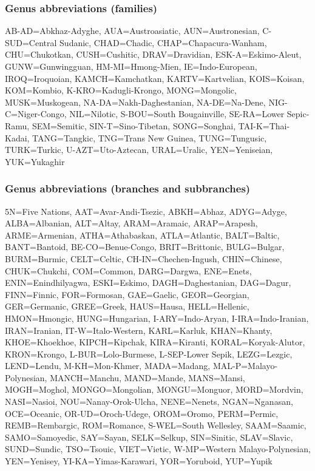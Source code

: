 
\subsubsection{Genus abbreviations (families)}
\begin{flushleft}
AB-AD=Abkhaz-Adyghe, AUA=Austroasiatic, AUN=Austronesian, C-SUD=Central Sudanic, CHAD=Chadic, CHAP=Chapacura-Wanham, CHU=Chukotkan, CUSH=Cushitic, DRAV=Dravidian, ESK-A=Eskimo-Aleut, GUNW=Gunwingguan, HM-MI=Hmong-Mien, IE=Indo-European, IROQ=Iroquoian, KAMCH=Kamchatkan, KARTV=Kartvelian, KOIS=Koisan, KOM=Kombio, K-KRO=Kadugli-Krongo, MONG=Mongolic, MUSK=Muskogean, NA-DA=Nakh-Daghestanian, NA-DE=Na-Dene, NIG-C=Niger-Congo, NIL=Nilotic, S-BOU=South Bougainville, SE-RA=Lower Sepic-Ramu, SEM=Semitic, SIN-T=Sino-Tibetan, SONG=Songhai, TAI-K=Thai-Kadai, TANG=Tangkic, TNG=Trans New Guinea, TUNG=Tungusic, TURK=Turkic, U-AZT=Uto-Aztecan, URAL=Uralic, YEN=Yeniseian, YUK=Yukaghir
\end{flushleft}

\subsubsection{Genus abbreviations (branches and subbranches)}
\begin{flushleft}
5N=Five Nations, AAT=Avar-Andi-Tsezic, ABKH=Abhaz, ADYG=Adyge, ALBA=Albanian, ALT=Altay, ARAM=Aramaic, ARAP=Arapesh, ARME=Armenian, ATHA=Athabaskan, ATLA=Atlantic, BALT=Baltic, BANT=Bantoid, BE-CO=Benue-Congo, BRIT=Brittonic, BULG=Bulgar, BURM=Burmic, CELT=Celtic, CH-IN=Chechen-Ingush, CHIN=Chinese, CHUK=Chukchi, COM=Common, DARG=Dargwa, ENE=Enets, ENIN=Enindhilyagwa, ESKI=Eskimo, DAGH=Daghestanian, DAG=Dagur, FINN=Finnic, FOR=Formosan, GAE=Gaelic, GEOR=Georgian, GER=Germanic, GREE=Greek, HAUS=Hausa, HELL=Hellenic, HMON=Hmongic, HUNG=Hungarian, I-ARY=Indo-Aryan, I-IRA=Indo-Iranian, IRAN=Iranian, IT-W=Italo-Western, KARL=Karluk, KHAN=Khanty, KHOE=Khoekhoe, KIPCH=Kipchak, KIRA=Kiranti, KORAL=Koryak-Alutor, KRON=Krongo, L-BUR=Lolo-Burmese, L-SEP-Lower Sepik, LEZG=Lezgic, LEND=Lendu, M-KH=Mon-Khmer, MADA=Madang, MAL-P=Malayo-Polynesian, MANCH=Manchu, MAND=Mande, MANS=Mansi, MOGH=Moghol, MONGO=Mongolian, MONGU=Monguor, MORD=Mordvin, NASI=Nasioi, NOU=Nanay-Orok-Ulcha, NENE=Nenets, NGAN=Nganasan, OCE=Oceanic, OR-UD=Oroch-Udege, OROM=Oromo, PERM=Permic,  REMB=Rembargic, ROM=Romance, S-WEL=South Wellesley, SAAM=Saamic, SAMO=Samoyedic, SAY=Sayan, SELK=Selkup, SIN=Sinitic, SLAV=Slavic, SUND=Sundic, TSO=Tsouic, VIET=Vietic, W-MP=Western Malayo-Polynesian, YEN=Yenisey, YI-KA=Yimas-Karawari, YOR=Yoruboid, YUP=Yupik
\end{flushleft}

